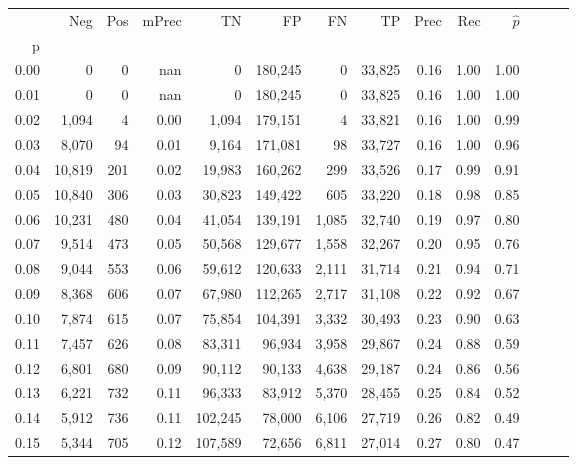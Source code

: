 \begin{tabular}{rrrrrrrrrrrrrr}
\toprule
{} &     Neg &  Pos & mPrec &       TN &       FP &      FN &      TP &  Prec &   Rec & $\hat{p}$ \\
p    &         &      &       &          &          &         &         &       &       &           \\
\midrule
0.00 &       0 &    0 &   nan &        0 &  180,245 &       0 &  33,825 &  0.16 &  1.00 &      1.00 \\
0.01 &       0 &    0 &   nan &        0 &  180,245 &       0 &  33,825 &  0.16 &  1.00 &      1.00 \\
0.02 &   1,094 &    4 &  0.00 &    1,094 &  179,151 &       4 &  33,821 &  0.16 &  1.00 &      0.99 \\
0.03 &   8,070 &   94 &  0.01 &    9,164 &  171,081 &      98 &  33,727 &  0.16 &  1.00 &      0.96 \\
0.04 &  10,819 &  201 &  0.02 &   19,983 &  160,262 &     299 &  33,526 &  0.17 &  0.99 &      0.91 \\
0.05 &  10,840 &  306 &  0.03 &   30,823 &  149,422 &     605 &  33,220 &  0.18 &  0.98 &      0.85 \\
0.06 &  10,231 &  480 &  0.04 &   41,054 &  139,191 &   1,085 &  32,740 &  0.19 &  0.97 &      0.80 \\
0.07 &   9,514 &  473 &  0.05 &   50,568 &  129,677 &   1,558 &  32,267 &  0.20 &  0.95 &      0.76 \\
0.08 &   9,044 &  553 &  0.06 &   59,612 &  120,633 &   2,111 &  31,714 &  0.21 &  0.94 &      0.71 \\
0.09 &   8,368 &  606 &  0.07 &   67,980 &  112,265 &   2,717 &  31,108 &  0.22 &  0.92 &      0.67 \\
0.10 &   7,874 &  615 &  0.07 &   75,854 &  104,391 &   3,332 &  30,493 &  0.23 &  0.90 &      0.63 \\
0.11 &   7,457 &  626 &  0.08 &   83,311 &   96,934 &   3,958 &  29,867 &  0.24 &  0.88 &      0.59 \\
0.12 &   6,801 &  680 &  0.09 &   90,112 &   90,133 &   4,638 &  29,187 &  0.24 &  0.86 &      0.56 \\
0.13 &   6,221 &  732 &  0.11 &   96,333 &   83,912 &   5,370 &  28,455 &  0.25 &  0.84 &      0.52 \\
0.14 &   5,912 &  736 &  0.11 &  102,245 &   78,000 &   6,106 &  27,719 &  0.26 &  0.82 &      0.49 \\
0.15 &   5,344 &  705 &  0.12 &  107,589 &   72,656 &   6,811 &  27,014 &  0.27 &  0.80 &      0.47 \\

\end{tabular}
